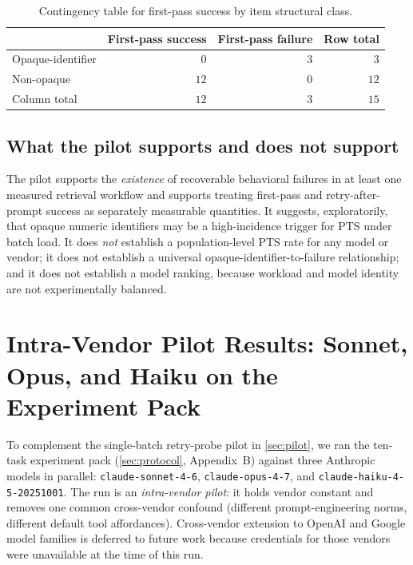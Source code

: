 \documentclass[11pt]{article}
\begin{document}
\begin{table}[h]
\centering\small
\caption{Contingency table for first-pass success by item structural class.}
\label{tab:contingency}
\begin{tabular}{l r r r}
\toprule
                       & \textbf{First-pass success} & \textbf{First-pass failure} & \textbf{Row total} \\
\midrule
Opaque-identifier      & $0$  & $3$ & $3$  \\
Non-opaque             & $12$ & $0$ & $12$ \\
\midrule
Column total           & $12$ & $3$ & $15$ \\
\bottomrule
\end{tabular}
\end{table}

\subsection{What the pilot supports and does not support}
The pilot supports the \emph{existence} of recoverable behavioral failures in at least one measured retrieval workflow and supports treating first-pass and retry-after-prompt success as separately measurable quantities. It suggests, exploratorily, that opaque numeric identifiers may be a high-incidence trigger for PTS under batch load. It does \emph{not} establish a population-level PTS rate for any model or vendor; it does not establish a universal opaque-identifier-to-failure relationship; and it does not establish a model ranking, because workload and model identity are not experimentally balanced.


\section{Intra-Vendor Pilot Results: Sonnet, Opus, and Haiku on the Experiment Pack}
\label{sec:intra-vendor}

To complement the single-batch retry-probe pilot in \cref{sec:pilot}, we ran the ten-task experiment pack (\cref{sec:protocol}, Appendix~B) against three Anthropic models in parallel: \texttt{claude-sonnet-4-6}, \texttt{claude-opus-4-7}, and \texttt{claude-haiku-4-5-20251001}. The run is an \emph{intra-vendor pilot}: it holds vendor constant and removes one common cross-vendor confound (different prompt-engineering norms, different default tool affordances). Cross-vendor extension to OpenAI and Google model families is deferred to future work because credentials for those vendors were unavailable at the time of this run.
\end{document}
